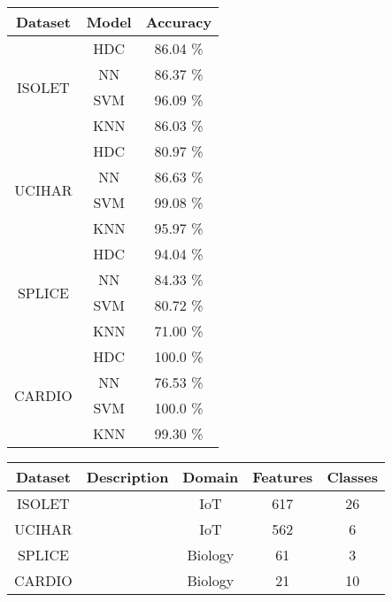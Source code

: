 \documentclass{standalone}
\begin{document}
    \begin{tabular}{|c|c|c|}
        \hline
        \textbf{Dataset} & \textbf{Model} & \textbf{Accuracy} \\
        \hline
        \multirow{4}{*}{ISOLET} & HDC   & 86.04 \% \\
                                & NN    & 86.37 \% \\
                                & SVM   & 96.09 \% \\
                                & KNN   & 86.03 \% \\
        \hline
        \multirow{4}{*}{UCIHAR} & HDC   & 80.97 \% \\
                                & NN    & 86.63 \% \\
                                & SVM   & 99.08 \% \\
                                & KNN   & 95.97 \% \\
        \hline
        \multirow{4}{*}{SPLICE} & HDC   & 94.04 \% \\
                                & NN    & 84.33 \% \\
                                & SVM   & 80.72 \% \\
                                & KNN   & 71.00 \% \\
        \hline
        \multirow{4}{*}{CARDIO} & HDC   & 100.0 \% \\
                                & NN    & 76.53 \% \\
                                & SVM   & 100.0 \% \\
                                & KNN   & 99.30 \% \\
        \hline
    \end{tabular}

    \begin{tabular}{|c|c|c|c|c|}
        \hline
        \textbf{Dataset} & \textbf{Description} & \textbf{Domain} & \textbf{Features} & \textbf{Classes} \\
        \hline
        ISOLET & & IoT        & 617   & 26 \\
        \hline
        UCIHAR & & IoT        & 562   & 6 \\
        \hline
        SPLICE & & Biology    & 61    & 3 \\
        \hline
        CARDIO & & Biology    & 21    & 10 \\
        \hline
    \end{tabular}
\end{document}
